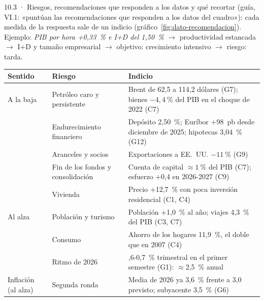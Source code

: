 \begin{complemento}{10.3 · Riesgos, recomendaciones que responden a los datos y qué recortar}
 (guía, VI.1: «puntúan las recomendaciones que responden a los datos del cuadro»): cada medida de la respuesta sale de un indicio (gráfico~\ref{fig:dato-recomendacion}). Ejemplo: \emph{PIB por hora +0,33~\% e I+D del 1,50~\%} $\to$ productividad estancada $\to$ I+D y tamaño empresarial $\to$ objetivo: crecimiento intensivo $\to$ riesgo: tarda.

\begin{figuracaja}
\caption{Del dato a la recomendación (infografía de la guía)}\label{fig:dato-recomendacion}
\end{figuracaja}

\begin{tablacaja}
\centering\scriptsize
\caption{Riesgos de las previsiones de 2026-2027 y su indicio en el cuadernillo}\label{tab:riesgos}
\begin{tabular}{>{\raggedright\arraybackslash}p{1.6cm}>{\raggedright\arraybackslash}p{5.2cm}>{\raggedright\arraybackslash}p{7.0cm}}
\toprule
\rowcolor{tceeazulpalido}
\textbf{Sentido} & \textbf{Riesgo} & \textbf{Indicio} \\
\midrule
A la baja & Petróleo caro y persistente & Brent de 62,5 a 114,2 dólares (G7); bienes $-4{,}4~\%$ del PIB en el choque de 2022 (C7) \\
 & Endurecimiento financiero & Depósito 2,50~\%; Euríbor +98~pb desde diciembre de 2025; hipotecas 3,04~\% (G12) \\
 & Aranceles y socios & Exportaciones a EE.~UU. $-11~\%$ (G9) \\
 & Fin de los fondos y consolidación & Cuenta de capital $\approx1~\%$ del PIB (C7); esfuerzo +0,4 en 2026-2027 (C9) \\
 & Vivienda & Precio +12,7~\% con poca inversión residencial (C1, C4) \\
Al alza & Población y turismo & Población +1,0~\% al año; viajes 4,3~\% del PIB (C3, C7) \\
 & Consumo & Ahorro de los hogares 11,9~\%, el doble que en 2007 (C4) \\
 & Ritmo de 2026 & 0,6-0,7~\% trimestral en el primer semestre (G1): $\approx$2,5~\% anual \\
Inflación (al alza) & Segunda ronda & Media de 2026 ya 3,6~\% frente a 3,0 previsto; subyacente 3,5~\% (G6) \\
\bottomrule
\end{tabular}
\end{tablacaja}


\end{complemento}
